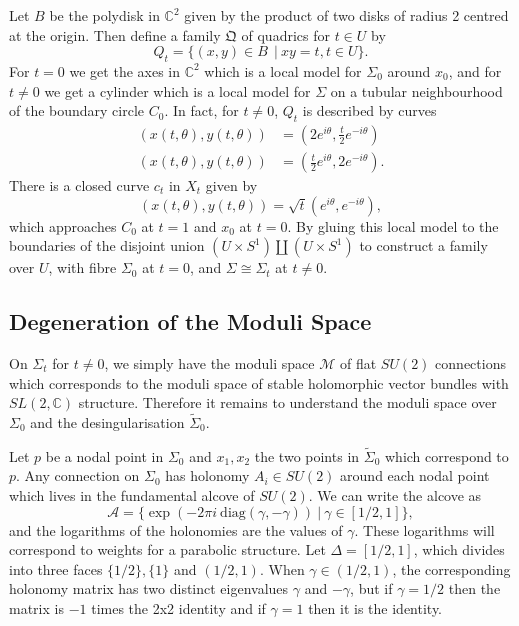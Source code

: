 \documentclass[]{article}
\newcommand{\C}{\mathbb{C}}
\newcommand{\MM}{\mathcal{M}}
\newcommand{\cA}{\mathcal{A}}
\newcommand{\QQ}{\mathfrak{Q}}
\begin{document}
	Let $B$ be the polydisk in $\C^2$ given by the product of two disks of radius 2 centred at the origin. Then define a family $\QQ$ of quadrics for $t\in U$ by 
	\begin{equation}
		Q_t = \{(x,y)\in B\ ~|~ xy = t, t\in U\}.
	\end{equation}
	For $t=0$ we get the axes in $\C^2$ which is a local model for $\Sigma_0$ around $x_0$, and for $t \neq 0$ we get a cylinder which is a local model for $\Sigma$ on a tubular neighbourhood of the boundary circle $C_0$. In fact, for $t\neq 0$, $Q_t$ is described by curves
	\begin{align*}
		(x(t,\theta), y(t, \theta)) &= \left(
		2e^{i\theta}, \frac{t}{2}e^{-i\theta}
		\right)\\
		(x(t,\theta), y(t, \theta)) &= \left(
		\frac{t}{2}e^{i\theta}, 2e^{-i\theta}
		\right).
	\end{align*}
	There is a closed curve $c_t$ in $X_t$ given by
	\begin{equation}
		(x(t,\theta), y(t,\theta)) = \sqrt{t}(e^{i\theta}, e^{-i\theta}),
	\end{equation}
	which approaches $C_0$ at $t=1$ and $x_0$ at $t=0$. By gluing this local model to the boundaries of the disjoint union $(U\times S^1)\coprod (U\times S^1)$ to construct a family over $U$, with fibre $\Sigma_0$ at $t=0$, and $\Sigma \cong \Sigma_t$ at $t\neq 0$.
\subsection{Degeneration of the Moduli Space}
	On $\Sigma_t$ for $t\neq 0$, we simply have the moduli space $\MM$ of flat $SU(2)$ connections which corresponds to the moduli space of stable holomorphic vector bundles with $SL(2,\C)$ structure. Therefore it remains to understand the moduli space over $\Sigma_0$ and the desingularisation $\tilde{\Sigma}_0$. 
	
	Let $p$ be a nodal point in $\Sigma_0$ and $x_1,x_2$ the two points in $\tilde{\Sigma}_0$ which correspond to $p$. Any connection on $\Sigma_0$ has holonomy $A_i\in SU(2)$ around each nodal point which lives in the fundamental alcove of $SU(2)$. We can write the alcove as
	\begin{equation}
		\cA = \{\exp\left(
		-2\pi i ~\text{diag}(\gamma, -\gamma)
		\right)~|~ \gamma \in[1/2,1]\},
	\end{equation}
	and the logarithms of the holonomies are the values of $\gamma$. These logarithms will correspond to weights for a parabolic structure. Let $\Delta = [1/2,1]$, which divides into three faces $\{1/2\}, \{1\}$ and $(1/2,1)$. When $\gamma \in (1/2,1)$, the corresponding holonomy matrix has two distinct eigenvalues $\gamma$ and $-\gamma$, but if $\gamma=1/2$ then the matrix is $-1$ times the 2x2 identity and if $\gamma=1$ then it is the identity. 
	
\end{document}
